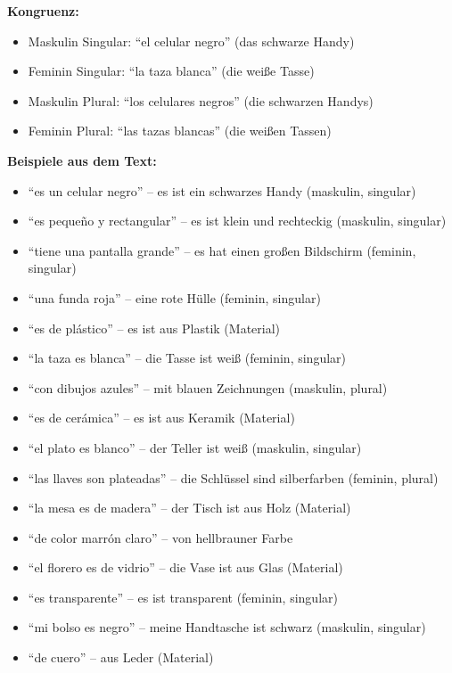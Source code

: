 \documentclass[12pt,a4paper]{article}
\begin{document}
\textbf{Kongruenz:}
\begin{itemize}[leftmargin=*]
    \item Maskulin Singular: \enquote{el celular negro} (das schwarze Handy)
    \item Feminin Singular: \enquote{la taza blanca} (die weiße Tasse)
    \item Maskulin Plural: \enquote{los celulares negros} (die schwarzen Handys)
    \item Feminin Plural: \enquote{las tazas blancas} (die weißen Tassen)
\end{itemize}

\textbf{Beispiele aus dem Text:}
\begin{itemize}[leftmargin=*]
    \item \enquote{es un celular negro} -- es ist ein schwarzes Handy (maskulin, singular)
    \item \enquote{es pequeño y rectangular} -- es ist klein und rechteckig (maskulin, singular)
    \item \enquote{tiene una pantalla grande} -- es hat einen großen Bildschirm (feminin, singular)
    \item \enquote{una funda roja} -- eine rote Hülle (feminin, singular)
    \item \enquote{es de plástico} -- es ist aus Plastik (Material)
    \item \enquote{la taza es blanca} -- die Tasse ist weiß (feminin, singular)
    \item \enquote{con dibujos azules} -- mit blauen Zeichnungen (maskulin, plural)
    \item \enquote{es de cerámica} -- es ist aus Keramik (Material)
    \item \enquote{el plato es blanco} -- der Teller ist weiß (maskulin, singular)
    \item \enquote{las llaves son plateadas} -- die Schlüssel sind silberfarben (feminin, plural)
    \item \enquote{la mesa es de madera} -- der Tisch ist aus Holz (Material)
    \item \enquote{de color marrón claro} -- von hellbrauner Farbe
    \item \enquote{el florero es de vidrio} -- die Vase ist aus Glas (Material)
    \item \enquote{es transparente} -- es ist transparent (feminin, singular)
    \item \enquote{mi bolso es negro} -- meine Handtasche ist schwarz (maskulin, singular)
    \item \enquote{de cuero} -- aus Leder (Material)
\end{itemize}
\end{document}
